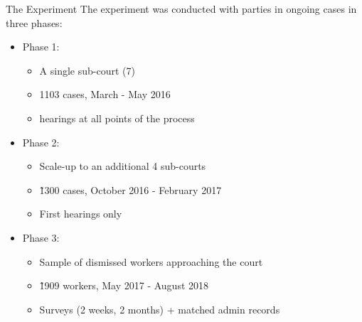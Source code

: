 \documentclass[9pt]{beamer}
\begin{document}
\begin{frame}{The Experiment}{}
The experiment was conducted with parties in ongoing cases in three phases:
   \begin{itemize}
       \item Phase 1: 
       \begin{itemize}
           \item A single sub-court (7)
           \item 1103 cases, March - May 2016
           \item hearings at all points of the process
       \end{itemize}
  \pause     
       \item Phase 2: 
       \begin{itemize}
           \item Scale-up to an additional 4 sub-courts
           \item \~1300 cases, October 2016 - February 2017
           \item First hearings only
       \end{itemize}
\pause
    \item Phase 3:
    \begin{itemize}
           \item Sample of dismissed workers approaching the court
           \item \~1909 workers, May 2017 - August 2018
           \item Surveys (2 weeks, 2 months) + matched admin records
       \end{itemize}
       \end{itemize}
\end{frame}

\end{document}
